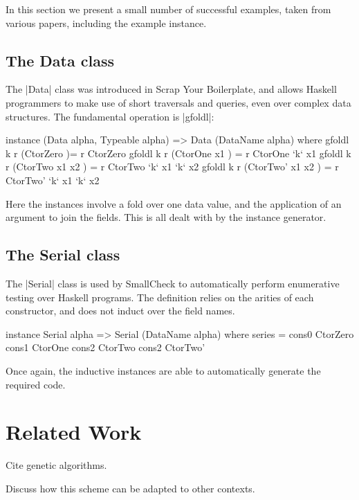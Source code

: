 \documentclass{llncs}
\begin{document}
In this section we present a small number of successful examples, taken from various papers, including the example instance.


\subsection{The Data class}

The |Data| class was introduced in Scrap Your Boilerplate, and allows Haskell programmers to make use of short traversals and queries, even over complex data structures. The fundamental operation is |gfoldl|:

\begin{code}
instance (Data alpha, Typeable alpha) => Data (DataName alpha) where
    gfoldl k r (CtorZero         )= r CtorZero
    gfoldl k r (CtorOne   x1     ) = r CtorOne   `k` x1
    gfoldl k r (CtorTwo   x1 x2  ) = r CtorTwo   `k` x1 `k` x2
    gfoldl k r (CtorTwo'  x1 x2  ) = r CtorTwo'  `k` x1 `k` x2
\end{code}

Here the instances involve a fold over one data value, and the application of an argument to join the fields. This is all dealt with by the instance generator.

\subsection{The Serial class}

The |Serial| class is used by SmallCheck to automatically perform enumerative testing over Haskell programs. The definition relies on the arities of each constructor, and does not induct over the field names.

\begin{code}
instance Serial alpha => Serial (DataName alpha) where
    series = cons0 CtorZero \/ cons1 CtorOne  \/ cons2 CtorTwo  \/ cons2 CtorTwo'
\end{code}

Once again, the inductive instances are able to automatically generate the required code.

\section{Related Work}

Cite genetic algorithms.

Discuss how this scheme can be adapted to other contexts.
\end{document}
